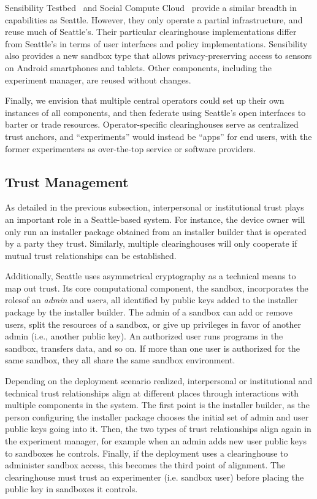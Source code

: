 Sensibility Testbed~\cite{zhuang2014sensibility} and Social Compute
Cloud~\cite{caton2014social} provide a similar breadth in capabilities
as Seattle. However, they only operate a partial infrastructure, and
reuse much of Seattle's. Their particular clearinghouse
implementations differ from Seattle's in terms of user interfaces
and policy implementations. Sensibility also provides a new sandbox
type that allows privacy-preserving access to sensors on Android
smartphones and tablets. Other components, including the experiment
manager, are reused without changes.

Finally, we envision that multiple central operators
could set up their own instances of
all components, and then federate using Seattle's open interfaces
to barter or trade resources. %
Operator-specific clearinghouses serve as centralized trust
anchors, and ``experiments'' would instead be ``apps'' for
end users, with the former experimenters as over-the-top service or
software providers.



\subsection{Trust Management}\label{sec-trust}

As detailed in the previous subsection, interpersonal or
institutional trust plays an important role in a Seattle-based
system. For instance, the device owner will only run an
installer package obtained from an installer builder that is
operated by a party they trust. Similarly, multiple clearinghouses
will only cooperate if mutual trust relationships can be
established.

Additionally, Seattle uses asymmetrical cryptography as
a technical means to map out trust.
Its core computational component, the sandbox, incorporates the rolesof
an \textit{admin}
and \textit{users}, all identified by
public keys added to the installer package by the
installer builder. The admin of a sandbox can add or remove
users, split the resources of a sandbox, or give up privileges
in favor of another admin (i.e., another public key).
An authorized user runs programs in the sandbox, transfers data,
and so on. If more than one user is authorized for the same
sandbox, they all share the same sandbox environment.

Depending on the deployment scenario realized, interpersonal
or institutional
and technical trust relationships align at different places
through interactions with multiple components in the system.
The first point is the installer builder, as the person configuring
the installer package chooses the initial set of admin and user public
keys going into it. Then, the two types of trust relationships align
again in the experiment manager, for example when an admin adds new user public
keys to sandboxes he controls. Finally, if the deployment uses a
clearinghouse to administer sandbox access, this becomes the
third point of alignment. The clearinghouse must trust an experimenter
(i.e. sandbox user) before placing the public key in sandboxes
it controls.

